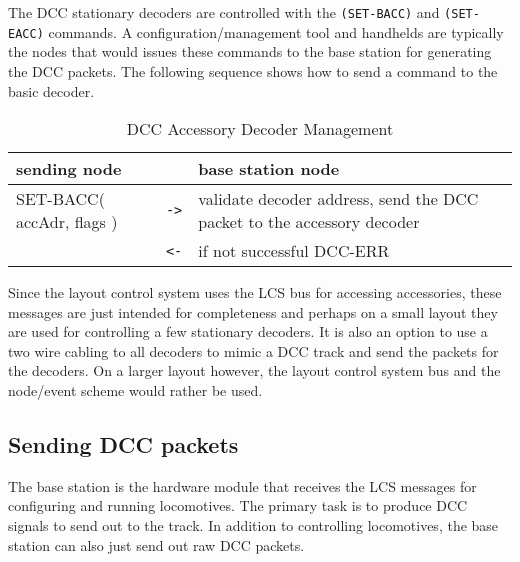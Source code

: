 The DCC stationary decoders are controlled with the \texttt{(SET-BACC)} and \texttt{(SET-EACC)} commands. A configuration/management tool and handhelds are typically the nodes that would issues these commands to the base station for generating the DCC packets. The following sequence shows how to send a command to the basic decoder.

\begin{table}[ht!]
    \begin{center}
        \caption{DCC Accessory Decoder Management}
        \begin{tabular}{|p{}| c |p{}|}
            \toprule
            \textbf{sending node} & & \textbf{ base station node} \\
            \midrule
            SET-BACC( accAdr, flags ) & \texttt{->} & validate decoder address, send the DCC packet to the accessory decoder \\
            & \texttt{<-} & if not successful DCC-ERR \\
            \bottomrule
        \end{tabular}
    \end{center}
\end{table}

Since the layout control system uses the LCS bus for accessing accessories, these messages are just intended for completeness and perhaps on a small layout they are used for controlling a few stationary decoders. It is also an option to use a two wire cabling to all decoders to mimic a DCC track and send the packets for the decoders. On a larger layout however, the layout control system bus and the node/event scheme would rather be used.

\subsection{Sending DCC packets}

The base station is the hardware module that receives the LCS messages for configuring and running locomotives. The primary task is to produce DCC signals to send out to the track. In addition to controlling locomotives, the base station can also just send out raw DCC packets.

